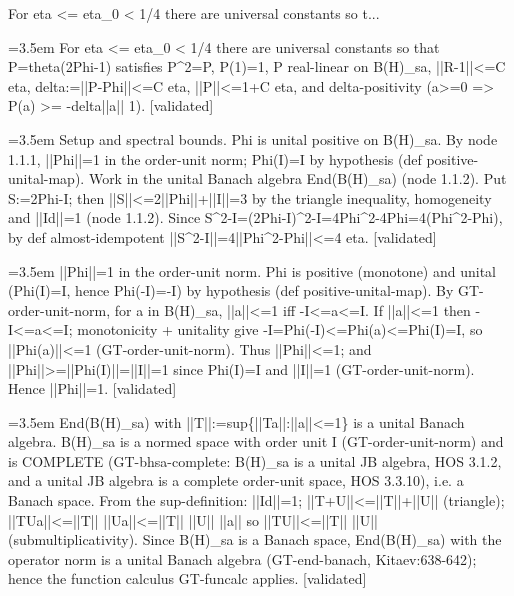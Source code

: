 \documentclass{article}
\newcommand{\step}[1]{\par\noindent\hangindent=3.5em\hangafter=1%
  \makebox[3.5em][l]{\textbf{#1.}}}
\newcommand{\steptag}[1]{\hfill{\small\textsf{[#1]}}}
\begin{document}
\begin{proofbox}{For eta <= eta\_0 < 1/4 there are universal constants so t...}
\step{1} For eta <= eta\_0 < 1/4 there are universal constants so that P=theta(2Phi-1) satisfies P\textasciicircum{}2=P, P(1)=1, P real-linear on B(H)\_sa, ||R-1||<=C eta, delta:=||P-Phi||<=C eta, ||P||<=1+C eta, and delta-positivity (a>=0 => P(a) >= -delta||a|| 1). \steptag{validated} \\[6pt]
\step{1.1} Setup and spectral bounds. Phi is unital positive on B(H)\_sa. By node 1.1.1, ||Phi||=1 in the order-unit norm; Phi(I)=I by hypothesis (def positive-unital-map). Work in the unital Banach algebra End(B(H)\_sa) (node 1.1.2). Put S:=2Phi-I; then ||S||<=2||Phi||+||I||=3 by the triangle inequality, homogeneity and ||Id||=1 (node 1.1.2). Since S\textasciicircum{}2-I=(2Phi-I)\textasciicircum{}2-I=4Phi\textasciicircum{}2-4Phi=4(Phi\textasciicircum{}2-Phi), by def almost-idempotent ||S\textasciicircum{}2-I||=4||Phi\textasciicircum{}2-Phi||<=4 eta. \steptag{validated} \\[6pt]
\step{1.1.1} ||Phi||=1 in the order-unit norm. Phi is positive (monotone) and unital (Phi(I)=I, hence Phi(-I)=-I) by hypothesis (def positive-unital-map). By GT-order-unit-norm, for a in B(H)\_sa, ||a||<=1 iff -I<=a<=I. If ||a||<=1 then -I<=a<=I; monotonicity + unitality give -I=Phi(-I)<=Phi(a)<=Phi(I)=I, so ||Phi(a)||<=1 (GT-order-unit-norm). Thus ||Phi||<=1; and ||Phi||>=||Phi(I)||=||I||=1 since Phi(I)=I and ||I||=1 (GT-order-unit-norm). Hence ||Phi||=1. \steptag{validated} \\[4pt]
\step{1.1.2} End(B(H)\_sa) with ||T||:=sup\{||Ta||:||a||<=1\} is a unital Banach algebra. B(H)\_sa is a normed space with order unit I (GT-order-unit-norm) and is COMPLETE (GT-bhsa-complete: B(H)\_sa is a unital JB algebra, HOS 3.1.2, and a unital JB algebra is a complete order-unit space, HOS 3.3.10), i.e. a Banach space. From the sup-definition: ||Id||=1; ||T+U||<=||T||+||U|| (triangle); ||TUa||<=||T|| ||Ua||<=||T|| ||U|| ||a|| so ||TU||<=||T|| ||U|| (submultiplicativity). Since B(H)\_sa is a Banach space, End(B(H)\_sa) with the operator norm is a unital Banach algebra (GT-end-banach, Kitaev:638-642); hence the function calculus GT-funcalc applies. \steptag{validated} \\[4pt]

\end{proofbox}
\end{document}
